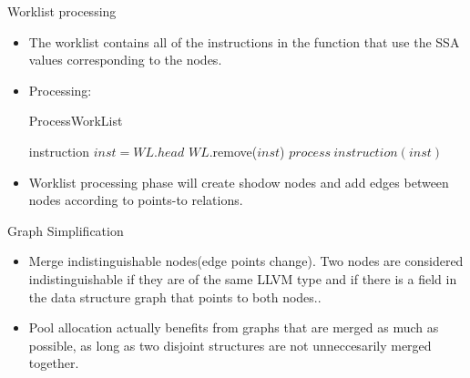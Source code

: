 \documentclass{beamer}
\begin{document}
\begin{frame}{Worklist processing}
  \begin{itemize}
	\item The worklist contains all of the instructions in the function that use
the SSA values corresponding to the nodes.
\item Processing:
  \begin{algorithm}[H]
	\caption{ProcessWorkList}
	\begin{algorithmic}[1]
	  \STATE instruction $inst = WL.head$
	  \STATE $WL.$remove($inst$)
	  \STATE $process\ instruction(inst)$
	  \ENDWHILE
	\end{algorithmic}
  \end{algorithm}
\item Worklist processing phase will create shodow nodes and add edges between nodes according to points-to relations.
  \end{itemize}
\end{frame}

\begin{frame}{Graph Simplification}
  \begin{itemize}
	\item Merge indistinguishable nodes(edge points change). Two nodes are considered
	  indistinguishable if they are of the same LLVM type and if there is a field in the data structure graph that points to both nodes..
	  \item Pool allocation actually benefits from graphs that are
merged as much as possible, as long as two disjoint structures are
not unneccesarily merged together.
  \end{itemize}
\end{frame}
\end{document}
